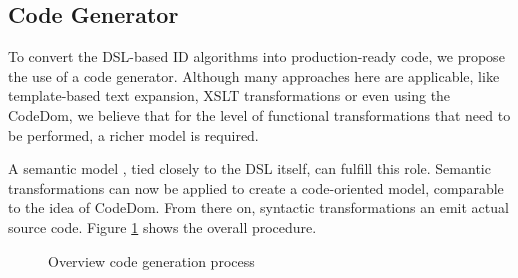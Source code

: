 \documentclass[conference]{IEEEtran}
\begin{document}
\subsection*{Code Generator}

To convert the DSL-based ID algorithms into production-ready code, we propose
the use of a code generator. Although many approaches here are applicable, like
template-based text expansion, XSLT transformations or even using the
CodeDom\cite{dollard2004code}, we believe that for the level of functional
transformations that need to be performed, a richer model is required.

A semantic model \cite{fowler2010domain}, tied closely to the DSL itself, can
fulfill this role. Semantic transformations can now be applied to create a
code-oriented model, comparable to the idea of CodeDom. From there on,
syntactic transformations an emit actual source code. Figure
\ref{fig:code-generation} shows the overall procedure.

\begin{figure}[ht]
  \centering
\caption{Overview code generation process}
\label{fig:code-generation}
\end{figure}
\end{document}
